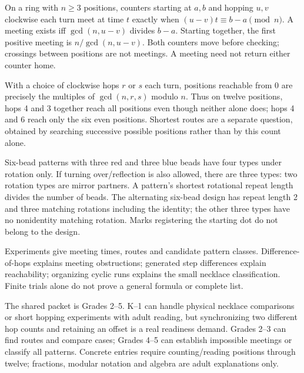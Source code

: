 On a ring with $n\ge3$ positions, counters starting at $a,b$ and hopping $u,v$ clockwise each turn meet at time $t$ exactly when $(u-v)t\equiv b-a\pmod n$. A meeting exists iff $\gcd(n,u-v)$ divides $b-a$. Starting together, the first positive meeting is $n/\gcd(n,u-v)$. Both counters move before checking; crossings between positions are not meetings. A meeting need not return either counter home.

With a choice of clockwise hops $r$ or $s$ each turn, positions reachable from 0 are precisely the multiples of $\gcd(n,r,s)$ modulo $n$. Thus on twelve positions, hops 4 and 3 together reach all positions even though neither alone does; hops 4 and 6 reach only the six even positions. Shortest routes are a separate question, obtained by searching successive possible positions rather than by this count alone.

Six-bead patterns with three red and three blue beads have four types under rotation only. If turning over/reflection is also allowed, there are three types: two rotation types are mirror partners. A pattern's shortest rotational repeat length divides the number of beads. The alternating six-bead design has repeat length 2 and three matching rotations including the identity; the other three types have no nonidentity matching rotation. Marks registering the starting dot do not belong to the design.

Experiments give meeting times, routes and candidate pattern classes. Difference-of-hops explains meeting obstructions; generated step differences explain reachability; organizing cyclic runs explains the small necklace classification. Finite trials alone do not prove a general formula or complete list.

The shared packet is Grades 2--5. K--1 can handle physical necklace comparisons or short hopping experiments with adult reading, but synchronizing two different hop counts and retaining an offset is a real readiness demand. Grades 2--3 can find routes and compare cases; Grades 4--5 can establish impossible meetings or classify all patterns. Concrete entries require counting/reading positions through twelve; fractions, modular notation and algebra are adult explanations only.

